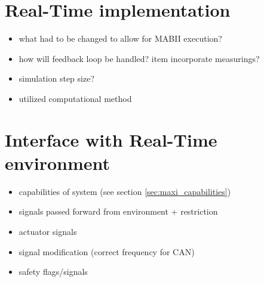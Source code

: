 \documentclass[ExampleMasters.tex]{subfiles}
\begin{document}
\section{Real-Time implementation}
\label{sec:real_time_implementation}

\begin{itemize}
	\item what had to be changed to allow for MABII execution?
	\item how will feedback loop be handled?
	item incorporate measurings?
	\item simulation step size?
	\item utilized computational method
\end{itemize}

\section{Interface with Real-Time environment}
\label{sec:interface_with_real_time}

\begin{itemize}
	\item capabilities of system (see section \ref{sec:maxi_capabilities})
	\item signals passed forward from environment + restriction
	
	\item actuator signals
	\item signal modification (correct frequency for CAN)
	\item safety flags/signals
	
\end{itemize}
\end{document}
